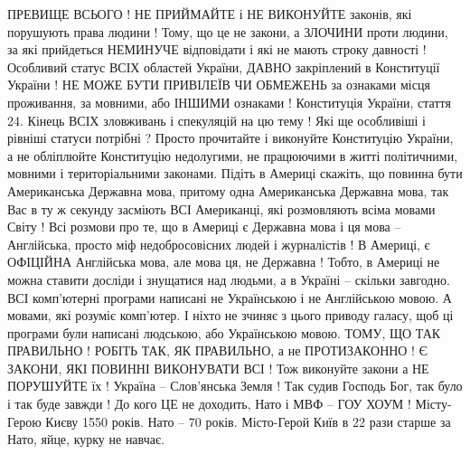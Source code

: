 \begin{itemize}
ПРЕВИЩЕ ВСЬОГО ! НЕ ПРИЙМАЙТЕ і НЕ ВИКОНУЙТЕ законів, які порушують права
людини ! Тому, що це не закони, а ЗЛОЧИНИ проти людини, за які прийдеться
НЕМИНУЧЕ відповідати і які не мають строку давності ! Особливий статус ВСІХ
областей України, ДАВНО закріплений в Конституції України ! НЕ МОЖЕ БУТИ
ПРИВІЛЕЇВ ЧИ ОБМЕЖЕНЬ за ознаками місця проживання, за мовними, або ІНШИМИ
ознаками ! Конституція України, стаття 24. Кінець ВСІХ зловживань і спекуляцій
на цю тему ! Які ще особливіші і рівніші статуси потрібні ? Просто прочитайте і
виконуйте Конституцію України, а не обліплюйте Конституцію недолугими, не
працюючими в житті політичними, мовними і територіальними законами. Підіть в
Америці скажіть, що повинна бути Американська Державна мова, притому одна
Американська Державна мова, так Вас в ту ж секунду засміють ВСІ Американці, які
розмовляють всіма мовами Світу ! Всі розмови про те, що в Америці є Державна
мова і ця мова – Англійська, просто міф недобросовісних людей і журналістів ! В
Америці, є ОФІЦІЙНА Англійська мова, але мова ця, не Державна ! Тобто, в
Америці не можна ставити досліди і знущатися над людьми, а в Україні – скільки
завгодно. ВСІ комп’ютерні програми написані не Українською і не Англійською
мовою. А мовами, які розуміє комп’ютер. І ніхто не зчиняє з цього приводу
галасу, щоб ці програми були написані людською, або Українською мовою. ТОМУ, ЩО
ТАК ПРАВИЛЬНО ! РОБІТЬ ТАК, ЯК ПРАВИЛЬНО, а не ПРОТИЗАКОННО ! Є ЗАКОНИ, ЯКІ
ПОВИННІ ВИКОНУВАТИ ВСІ ! Тож виконуйте закони а НЕ ПОРУШУЙТЕ їх ! Україна –
Слов’янська Земля ! Так судив Господь Бог, так було і так буде завжди ! До кого
ЦЕ не доходить, Нато і МВФ – ГОУ ХОУМ ! Місту-Герою Києву 1550 років. Нато – 70
років. Місто-Герой Київ в 22 рази старше за Нато, яйце, курку не навчає.

\end{itemize}

